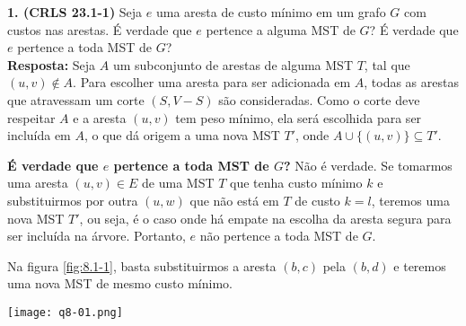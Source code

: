 
\noindent\textbf{1. (CRLS 23.1-1)} Seja $e$ uma aresta de custo mínimo em um grafo $G$ com custos nas arestas. É verdade que $e$ pertence a alguma MST de $G$? É verdade que $e$ pertence a toda MST de $G$?\\[6pt]
\textbf{Resposta:} Seja $A$ um subconjunto de arestas de alguma MST $T$, tal que $(u, v) \notin A$. Para escolher uma aresta para ser adicionada em $A$, todas as arestas que atravessam um corte $(S, V - S)$ são consideradas. Como o corte deve respeitar $A$ e a aresta $(u, v)$ tem peso mínimo, ela será escolhida para ser incluída em $A$, o que dá origem a uma nova MST $T'$, onde $A \cup \{(u, v)\} \subseteq T'$.

\textbf{É verdade que $e$ pertence a toda MST de $G$?}
Não é verdade. Se tomarmos uma aresta $(u, v) \in E$ de uma MST $T$ que tenha custo mínimo $k$ e substituirmos por outra $(u, w)$ que não está em $T$ de custo $k = l$, teremos uma nova MST $T'$, ou seja, é o caso onde há empate na escolha da aresta segura para ser incluída na árvore. Portanto, $e$ não pertence a toda MST de $G$.

Na figura \ref{fig:8.1-1}, basta substituirmos a aresta $(b, c)$ pela $(b, d)$ e teremos uma nova MST de mesmo custo mínimo.
\begin{center}
\texttt{[image: q8-01.png]}
\label{fig:8.1-1}
\end{center}